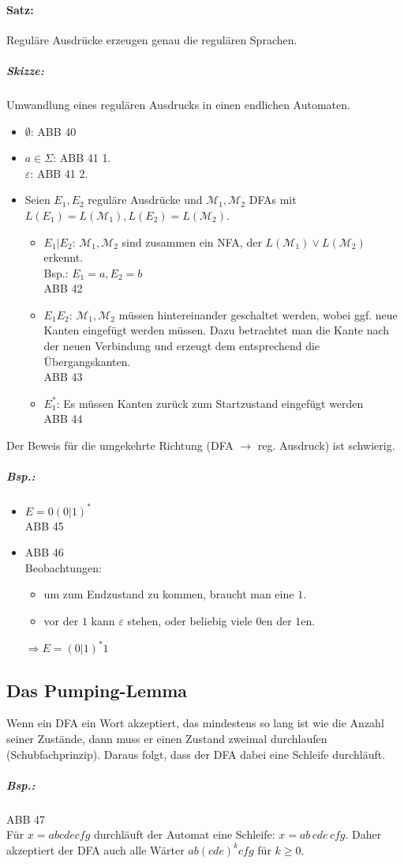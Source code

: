\paragraph{Satz:} Reguläre Ausdrücke erzeugen genau die regulären Sprachen.
\subparagraph{Skizze:} Umwandlung eines regulären Ausdrucks in einen endlichen Automaten.
\begin{itemize}
\item $\emptyset$: ABB 40
\item $a \in \Sigma$: ABB 41 1.\\
$\varepsilon$: ABB 41 2.
\item Seien $E_1, E_2$ reguläre Ausdrücke und $\mathcal{M}_1, \mathcal{M}_2$ DFAs mit $L(E_1)=L(\mathcal{M}_1), L(E_2)=L(\mathcal{M}_2)$.
\begin{itemize}
\item $E_1 | E_2$: $\mathcal{M}_1, \mathcal{M}_2$ sind zusammen ein NFA, der $L(\mathcal{M}_1) \vee L(\mathcal{M}_2)$ erkennt.\\
Bsp.: $E_1=a, E_2=b$\\
ABB 42
\item $E_1 E_2$: $\mathcal{M}_1, \mathcal{M}_2$ müssen hintereinander geschaltet werden, wobei ggf. neue Kanten eingefügt werden müssen. Dazu betrachtet man die Kante nach der neuen Verbindung und erzeugt dem entsprechend die Übergangskanten.\\
ABB 43
\item $E_1^*$: Es müssen Kanten zurück zum Startzustand eingefügt werden\\
ABB 44
\end{itemize}
\end{itemize}
Der Beweis für die umgekehrte Richtung (DFA $\to$ reg. Ausdruck) ist schwierig.
\subparagraph{Bsp.:}
\begin{itemize}
\item $E=0(0|1)^*$\\
ABB 45
\item ABB 46\\
Beobachtungen:
\begin{itemize}
\item um zum Endzustand zu kommen, braucht man eine $1$.
\item vor der $1$ kann $\varepsilon$ stehen, oder beliebig viele $0$en der $1$en.
\end{itemize}
$\Rightarrow E=(0|1)^* 1$
\end{itemize}

\subsection{Das Pumping-Lemma}
Wenn ein DFA ein Wort akzeptiert, das mindestens so lang ist wie die Anzahl seiner Zustände, dann muss er einen Zustand zweimal durchlaufen (Schubfachprinzip). Daraus folgt, dass der DFA dabei eine Schleife durchläuft.
\subparagraph{Bsp.:}\parskp
ABB 47\\
Für $x=abcdecfg$ durchläuft der Automat eine Schleife: $x=ab\,\boxed{cde}\,cfg$. Daher akzeptiert der DFA auch alle Wärter $ab(cde)^k cfg$ für $k \geq 0$.

